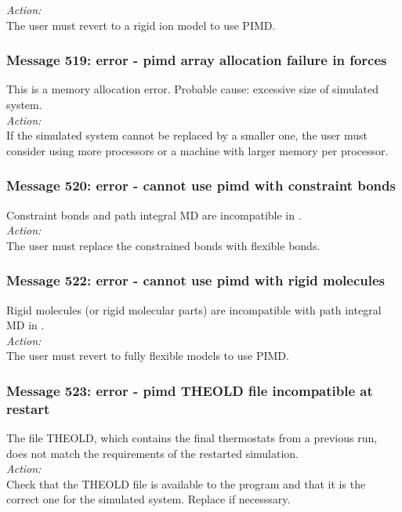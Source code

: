 \noindent
{\em Action:}\\
The user must revert to a rigid ion model to use PIMD.

\subsubsection*{Message 519: error - pimd array allocation failure in forces}

This is a memory allocation error. Probable cause: excessive size of
simulated system. \\

\noindent
{\em Action:}\\
If the simulated system cannot be replaced by a smaller one, the user
must consider using more processors or a machine with larger memory
per processor.

\subsubsection*{Message 520: error - cannot use pimd with constraint bonds}

Constraint bonds and path integral MD are incompatible in \DD{}.\\

\noindent
{\em Action:}\\
The user must replace the constrained bonds with flexible bonds.

\subsubsection*{Message 522: error - cannot use pimd with rigid molecules}

Rigid molecules (or rigid molecular parts) are incompatible with path
integral MD in \DD{}. \\

\noindent
{\em Action:}\\
The user must revert to fully flexible models to use PIMD.

\subsubsection*{Message 523: error - pimd THEOLD file incompatible at restart}

The file THEOLD, which contains the final thermostats from a previous run, 
does not match the requirements of the restarted simulation. \\

\noindent
{\em Action:}\\ Check that the THEOLD file is available to the
program and that it is the correct one for the simulated system.
Replace if necesssary.

